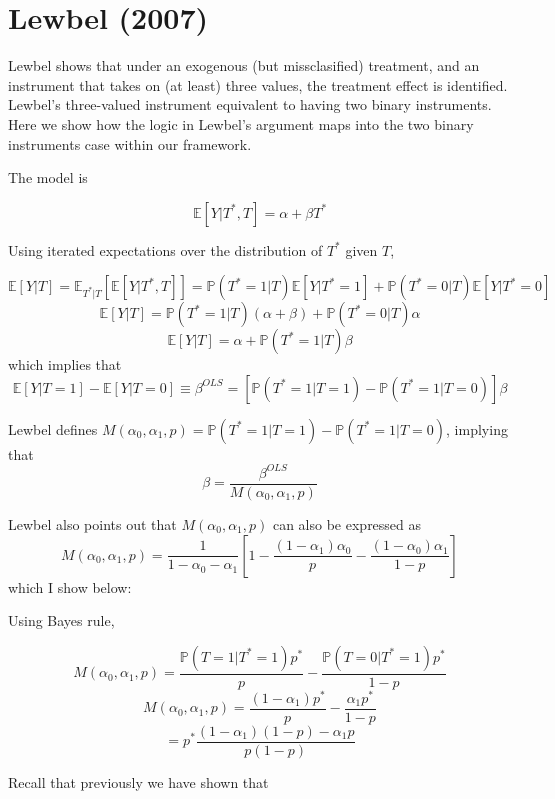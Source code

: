 \section{Lewbel (2007)}

Lewbel shows that under an exogenous (but missclasified) treatment,
and an instrument that takes on (at least) three values, the treatment
effect is identified. Lewbel's three-valued instrument equivalent
to having two binary instruments. Here we show how the logic in Lewbel's
argument maps into the two binary instruments case within our framework.

The model is 

\[
\mathbb{E}[Y|T^{*},T]=\alpha+\beta T^{*}
\]


Using iterated expectations over the distribution of $T^{*}$ given
$T$, 

\[
\mathbb{E}[Y|T]=\mathbb{E}_{T^{*}|T}\left[\mathbb{E}[Y|T^{*},T]\right]=\mathbb{P}(T^{*}=1|T)\mathbb{E}[Y|T^{*}=1]+\mathbb{P}(T^{*}=0|T)\mathbb{E}[Y|T^{*}=0]
\]
\[
\mathbb{E}[Y|T]=\mathbb{P}(T^{*}=1|T)(\alpha+\beta)+\mathbb{P}(T^{*}=0|T)\alpha
\]
\[
\mathbb{E}[Y|T]=\alpha+\mathbb{P}(T^{*}=1|T)\beta
\]
which implies that 
\[
\mathbb{E}[Y|T=1]-\mathbb{E}[Y|T=0]\equiv\beta^{OLS}=\left[\mathbb{P}(T^{*}=1|T=1)-\mathbb{P}(T^{*}=1|T=0)\right]\beta
\]


Lewbel defines $M(\alpha_{0},\alpha_{1},p)=\mathbb{P}(T^{*}=1|T=1)-\mathbb{P}(T^{*}=1|T=0)$,
implying that 
\begin{equation}
\beta=\frac{\beta^{OLS}}{M(\alpha_{0},\alpha_{1},p)}
\end{equation}


Lewbel also points out that $M(\alpha_{0},\alpha_{1},p)$ can also
be expressed as 
\[
M(\alpha_{0},\alpha_{1},p)=\frac{1}{1-\alpha_{0}-\alpha_{1}}\left[1-\frac{(1-\alpha_{1})\alpha_{0}}{p}-\frac{(1-\alpha_{0})\alpha_{1}}{1-p}\right]
\]
which I show below:

Using Bayes rule,

\[
M(\alpha_{0},\alpha_{1},p)=\frac{\mathbb{P}(T=1|T^{*}=1)p^{*}}{p}-\frac{\mathbb{P}(T=0|T^{*}=1)p^{*}}{1-p}
\]
\[
M(\alpha_{0},\alpha_{1},p)=\frac{(1-\alpha_{1})p^{*}}{p}-\frac{\alpha_{1}p^{*}}{1-p}
\]
\begin{equation}
=p^{*}\frac{(1-\alpha_{1})(1-p)-\alpha_{1}p}{p(1-p)}
\end{equation}


Recall that previously we have shown that

